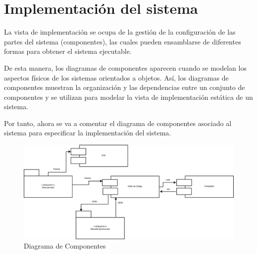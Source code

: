\chapter[Implementación del sistema]{\label{}
Implementación del sistema}

La vista de implementación se ocupa de la gestión de la configuración de las partes del sistema (componentes), las cuales pueden ensamblarse de diferentes formas para obtener el sistema ejecutable.

De esta manera, los diagramas de componentes aparecen cuando se modelan los aspectos físicos de los sistemas orientados a objetos. Así, los diagramas de componentes muestran la organización y las dependencias entre un conjunto de componentes y se utilizan para modelar la vista de implementación estática de un sistema.

Por tanto, ahora se va a comentar el diagrama de componentes asociado al sistema para especificar la implementación del sistema.

\begin{figure}[h]
	\includegraphics[width=\textwidth]{./img/componentes.eps}
	\caption{Diagrama de Componentes}
\end{figure}